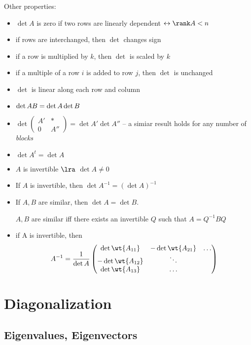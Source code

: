 \documentclass[11pt]{scrartcl}
\begin{document}
Other properties:
\begin{itemize}

\item \(\det A\) is zero if two rows are linearly dependent \(\leftrightarrow \rank A < n\)

\item if rows are interchanged, then \(\det\) changes sign

\item if a row is multiplied by \(k\), then \(\det\) is scaled by \(k\)

\item if a multiple of a row \(i\) is added to row \(j\), then \(\det\) is unchanged

\item \(\det\) is linear along each row and column

\item \(\det AB = \det A \* \det B\)
\item \(\det \begin{pmatrix}
    A' & *\\
    0 & A''
  \end{pmatrix} = \det A' \det A''\) -- a simiar result holds for any number of \emph{blocks}
\item \(\det A^{t} = \det A\)
\item \(A\) is invertible \(\lra\) \(\det A \neq 0\)
\item If \(A\) is invertible, then \(\det A^{-1} = (\det A)^{-1}\)
\item If \(A, B\) are similar, then \(\det A = \det B\).
  \begin{note*}
    \(A, B\) are similar iff there exists an invertible \(Q\) such that \(A = Q^{-1} B Q\)
  \end{note*}
\item if A is invertible, then
  \[
    A^{-1} = \frac{1}{\det A}
    \begin{pmatrix}
      \det \wt{A_{11}} & -\det \wt{A_{21}} & \dots\\
      - \det \wt{A_{12}} & \ddots & \\
      \det \wt{A_{13}} & \dots
    \end{pmatrix}
  \]
\end{itemize}

\section{Diagonalization}
\label{sec:diag}
\subsection{Eigenvalues, Eigenvectors}
\label{subsec:eig}
\end{document}
